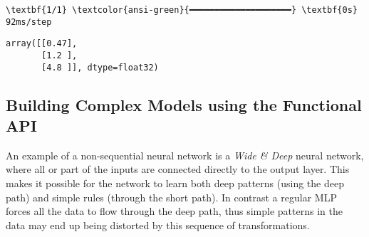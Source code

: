 \documentclass[12pt letter]{report}
\makeatletter
\newcommand{\boxspacing}{\kern\kvtcb@left@rule\kern\kvtcb@boxsep}
\newcommand{\prompt}[4]{
        {\ttfamily\llap{{\color{#2}[#3]:\hspace{3pt}#4}}\vspace{-\baselineskip}}
    }
\makeatother
\begin{document}
    \begin{Verbatim}[commandchars=\\\{\}]
\textbf{1/1} \textcolor{ansi-green}{━━━━━━━━━━━━━━━━━━━━} \textbf{0s} 92ms/step
    \end{Verbatim}

            \begin{tcolorbox}[breakable, size=fbox, boxrule=.5pt, pad at break*=1mm, opacityfill=0]
\prompt{Out}{outcolor}{25}{\boxspacing}
\begin{Verbatim}[commandchars=\\\{\}]
array([[0.47],
       [1.2 ],
       [4.8 ]], dtype=float32)
\end{Verbatim}
\end{tcolorbox}
        
\subsection{Building Complex Models using the Functional
API}\label{building-complex-models-using-the-functional-api}

An example of a non-sequential neural network is a \emph{Wide \& Deep}
neural network, where all or part of the inputs are connected directly
to the output layer. This makes it possible for the network to learn
both deep patterns (using the deep path) and simple rules (through the
short path). In contrast a regular MLP forces all the data to flow
through the deep path, thus simple patterns in the data may end up being
distorted by this sequence of transformations.
\end{document}
